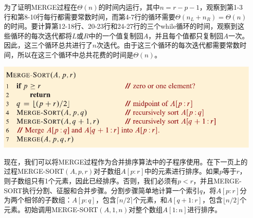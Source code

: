 \documentclass[lang=cn,newtx,10pt,scheme=chinese]{elegantbook}
\begin{document}
为了证明MERGE过程在$\Theta(n)$的时间内运行，其中$n=r-p-1$，观察到第1-3行和第8-10行每行都需要常数时间，而第4-7行的循环需要$\Theta(n_L+n_R)=\Theta(n)$的时间。要计算第12-18行、20-23行和24-27行的三个while循环的时间，观察到这些循环的每次迭代都将$L$或$R$中的一个值复制回$A$，并且每个值都只复制回$A$一次。因此，这三个循环总共进行了$n$次迭代。由于这三个循环的每次迭代都需要常数时间，所以在这三个循环中总共花费的时间是$\Theta(n)$。

\includegraphics{算法导论第四版插图/第二章/归并排序主程序.pdf}

现在，我们可以将MERGE过程作为合并排序算法中的子程序使用。在下一页上的过程MERGE-SORT$(A,p,r)$对子数组$A[p:r]$中的元素进行排序。如果$p$等于$r$，则子数组只有1个元素，因此已经排序。否则，我们必须有$p < r$，并且MERGE-SORT执行分割、征服和合并步骤。分割步骤简单地计算一个索引$q$，将$A[p:r]$分为两个相邻的子数组：$A[p:q]$，包含$\lceil{n/2}\rceil$个元素，和$A[q+1:r]$，包含$\lfloor{n/2}\rfloor$个元素。初始调用MERGE-SORT$(A,1,n)$对整个数组$A[1:n]$进行排序。
\end{document}
